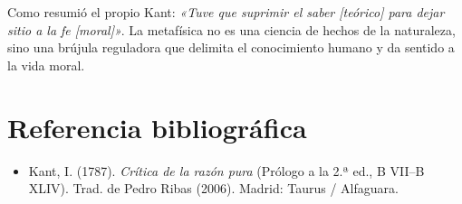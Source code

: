 \documentclass[a4paper, 11pt]{article}
\begin{document}
Como resumió el propio Kant: \textit{«Tuve que suprimir el saber [teórico] para dejar sitio a la fe [moral]»}. La metafísica no es una ciencia de hechos de la naturaleza, sino una brújula reguladora que delimita el conocimiento humano y da sentido a la vida moral.

\vspace{0.35cm}

\section*{Referencia bibliográfica}
\begin{itemize}
    \item Kant, I. (1787). \textit{Crítica de la razón pura} (Prólogo a la 2.ª ed., B VII--B XLIV). Trad. de Pedro Ribas (2006). Madrid: Taurus / Alfaguara.
\end{itemize}
\end{document}

